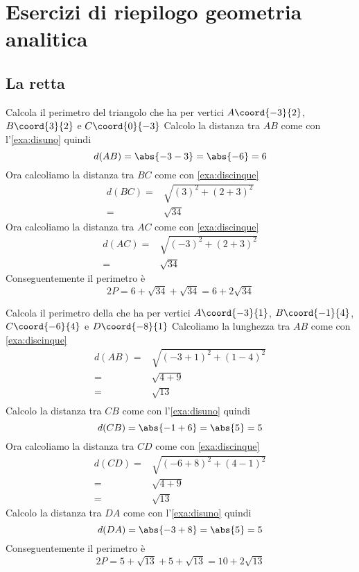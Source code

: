 %	
\chapter{Esercizi di riepilogo geometria analitica}
\section{La retta}
\tcbstartrecording
\begin{exercise}
Calcola il perimetro del triangolo che ha per vertici $A\coord{-3}{2}$, $B\coord{3}{2}$ e $C\coord{0}{-3}$
\tcblower
Calcolo la distanza tra $AB$ come con l'\cref{exa:disuno} 
quindi \[d(AB)=\abs{-3-3}=\abs{-6}=6\] Ora calcoliamo la distanza tra $BC$ come con \cref{exa:discinque} 
\begin{align*}
d(BC)=&\sqrt{(3)^2+(2+3)^2}\\
=&\sqrt{34}
\end{align*}
Ora calcoliamo la distanza tra $AC$ come con \cref{exa:discinque} 
\begin{align*}
d(AC)=&\sqrt{(-3)^2+(2+3)^2}\\
=&\sqrt{34}
\end{align*}
Conseguentemente il perimetro è
\[2P=6+\sqrt{34}+\sqrt{34}=6+2\sqrt{34}\]
\begin{center}
	
	\label{fig:EsRieDistanza11}
\end{center}
\end{exercise}
\begin{exercise}
	Calcola il perimetro della che ha per vertici $A\coord{-3}{1}$, $B\coord{-1}{4}$, $C\coord{-6}{4}$ e  $D\coord{-8}{1}$
	\tcblower
	Calcoliamo la lunghezza tra $AB$ come con \cref{exa:discinque} 
	\begin{align*}
		d(AB)=&\sqrt{(-3+1)^2+(1-4)^2}\\
		=&\sqrt{4+9}\\
		=&\sqrt{13}\\
	\end{align*}
	Calcolo la distanza tra $CB$ come con l'\cref{exa:disuno} 
	quindi \[d(CB)=\abs{-1+6}=\abs{5}=5\]
	Ora calcoliamo la distanza tra $CD$ come con \cref{exa:discinque} 
	\begin{align*}
		d(CD)=&\sqrt{(-6+8)^2+(4-1)^2}\\
			=&\sqrt{4+9}\\
		=&\sqrt{13}
	\end{align*}
	Calcolo la distanza tra $DA$ come con l'\cref{exa:disuno} 
	quindi \[d(DA)=\abs{-3+8}=\abs{5}=5\]
	Conseguentemente il perimetro è
	\[2P=5+\sqrt{13}+5+\sqrt{13}=10+2\sqrt{13}\]
	\begin{center}
		
		\label{fig:EsRieDistanza12}
	\end{center}
\end{exercise}
